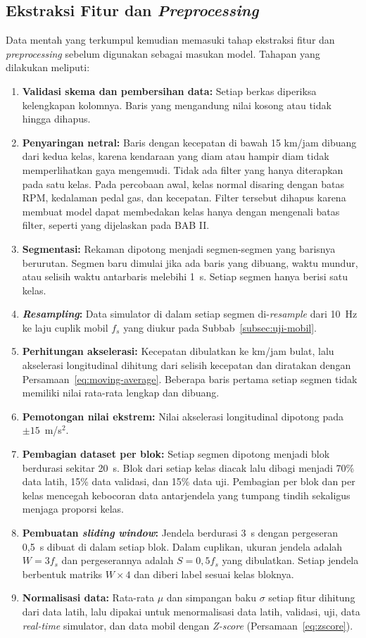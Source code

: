 \subsection{Ekstraksi Fitur dan \textit{Preprocessing}}
Data mentah yang terkumpul kemudian memasuki tahap ekstraksi fitur dan \textit{preprocessing} sebelum digunakan sebagai masukan model. Tahapan yang dilakukan meliputi:
\begin{enumerate}
    \item \textbf{Validasi skema dan pembersihan data:} Setiap berkas diperiksa kelengkapan kolomnya. Baris yang mengandung nilai kosong atau tidak hingga dihapus.
    \item \textbf{Penyaringan netral:} Baris dengan kecepatan di bawah 15 km/jam dibuang dari kedua kelas, karena kendaraan yang diam atau hampir diam tidak memperlihatkan gaya mengemudi. Tidak ada filter yang hanya diterapkan pada satu kelas. Pada percobaan awal, kelas normal disaring dengan batas RPM, kedalaman pedal gas, dan kecepatan. Filter tersebut dihapus karena membuat model dapat membedakan kelas hanya dengan mengenali batas filter, seperti yang dijelaskan pada BAB II.
    \item \textbf{Segmentasi:} Rekaman dipotong menjadi segmen-segmen yang barisnya berurutan. Segmen baru dimulai jika ada baris yang dibuang, waktu mundur, atau selisih waktu antarbaris melebihi 1~s. Setiap segmen hanya berisi satu kelas.
    \item \textbf{\textit{Resampling}:} Data simulator di dalam setiap segmen di-\textit{resample} dari 10~Hz ke laju cuplik mobil $f_{s}$ yang diukur pada Subbab~\ref{subsec:uji-mobil}.
    \item \textbf{Perhitungan akselerasi:} Kecepatan dibulatkan ke km/jam bulat, lalu akselerasi longitudinal dihitung dari selisih kecepatan dan diratakan dengan Persamaan~\ref{eq:moving-average}. Beberapa baris pertama setiap segmen tidak memiliki nilai rata-rata lengkap dan dibuang.
    \item \textbf{Pemotongan nilai ekstrem:} Nilai akselerasi longitudinal dipotong pada $\pm 15$~m/s$^{2}$.
    \item \textbf{Pembagian dataset per blok:} Setiap segmen dipotong menjadi blok berdurasi sekitar 20~s. Blok dari setiap kelas diacak lalu dibagi menjadi 70\% data latih, 15\% data validasi, dan 15\% data uji. Pembagian per blok dan per kelas mencegah kebocoran data antarjendela yang tumpang tindih sekaligus menjaga proporsi kelas.
    \item \textbf{Pembuatan \textit{sliding window}:} Jendela berdurasi 3~s dengan pergeseran 0,5~s dibuat di dalam setiap blok. Dalam cuplikan, ukuran jendela adalah $W = 3 f_{s}$ dan pergeserannya adalah $S = 0{,}5 f_{s}$ yang dibulatkan. Setiap jendela berbentuk matriks $W \times 4$ dan diberi label sesuai kelas bloknya.
    \item \textbf{Normalisasi data:} Rata-rata $\mu$ dan simpangan baku $\sigma$ setiap fitur dihitung dari data latih, lalu dipakai untuk menormalisasi data latih, validasi, uji, data \textit{real-time} simulator, dan data mobil dengan \textit{Z-score} (Persamaan~\ref{eq:zscore}).
\end{enumerate}
